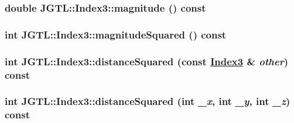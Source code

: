 \hypertarget{class_j_g_t_l_1_1_index3_68ee3c05f26c463c7d936b94004ae097}{
\subsubsection[magnitude]{\setlength{\rightskip}{0pt plus 5cm}double JGTL::Index3::magnitude () const}}
\label{class_j_g_t_l_1_1_index3_68ee3c05f26c463c7d936b94004ae097}


\hypertarget{class_j_g_t_l_1_1_index3_c6cd24ce82dfa087a968646a9aa3fc58}{
\subsubsection[magnitudeSquared]{\setlength{\rightskip}{0pt plus 5cm}int JGTL::Index3::magnitude\-Squared () const}}
\label{class_j_g_t_l_1_1_index3_c6cd24ce82dfa087a968646a9aa3fc58}


\hypertarget{class_j_g_t_l_1_1_index3_382f9ffa86227b2d180ea50ed3a9ddff}{
\subsubsection[distanceSquared]{\setlength{\rightskip}{0pt plus 5cm}int JGTL::Index3::distance\-Squared (const \hyperlink{class_j_g_t_l_1_1_index3}{Index3} \& {\em other}) const}}
\label{class_j_g_t_l_1_1_index3_382f9ffa86227b2d180ea50ed3a9ddff}


\hypertarget{class_j_g_t_l_1_1_index3_429d6d9c51948aec9bff8ae4e5df2b43}{
\subsubsection[distanceSquared]{\setlength{\rightskip}{0pt plus 5cm}int JGTL::Index3::distance\-Squared (int {\em \_\-x}, int {\em \_\-y}, int {\em \_\-z}) const}}
\label{class_j_g_t_l_1_1_index3_429d6d9c51948aec9bff8ae4e5df2b43}


